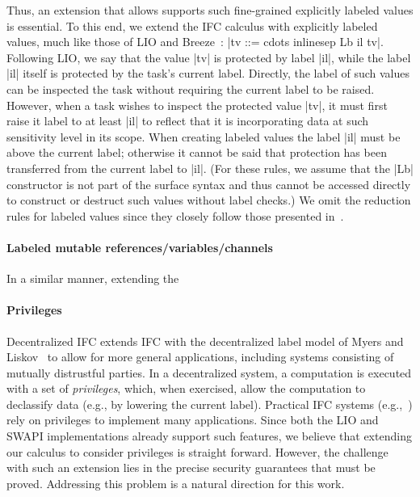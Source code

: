 Thus, an extension that allows supports such fine-grained explicitly
labeled values is essential.
%
To this end, we extend the IFC calculus with explicitly labeled
values, much like those of LIO and
Breeze~\cite{lio, Hritcu:2013:YIB:2497621.2498098}: |tv ::= cdots
inlinesep Lb il tv|.
%
Following LIO, we say that the value |tv| is protected by label |il|,
while the label |il| itself is protected by the task's current label.
%
%
Directly, the label of such values can be inspected the task without
requiring the current label to be raised.
%
However, when a task wishes to inspect the protected value |tv|, it
must first raise it label to at least |il| to reflect that it is
incorporating data at such sensitivity level in its scope.
%
When creating labeled values the label |il| must be above
the current label; otherwise it cannot be said that protection has
been transferred from the current label to |il|.
%
(For these rules, we assume that the |Lb| constructor is not part of
the surface syntax and thus cannot be accessed directly to construct
or destruct such values without label checks.)
% 
We omit the reduction rules for labeled values since they closely
follow those presented in~\cite{lio}.

\paragraph{Labeled mutable references/variables/channels}
%
In a similar manner, extending the 

\paragraph{Privileges}
Decentralized IFC extends IFC with the decentralized label model of
Myers and Liskov~\cite{myers:dlm} to allow for more general
applications, including systems consisting of mutually distrustful
parties.  In a decentralized system, a computation is executed with a
set of \emph{privileges}, which, when exercised, allow the computation
to declassify data (e.g., by lowering the current label).
%
Practical IFC systems
(e.g.,~\cite{Zeldovich:2006, lio,
Hritcu:2013:YIB:2497621.2498098, myers:jif}) rely on privileges to
implement many applications.
%
Since both the LIO and SWAPI implementations already support such features,
we believe that extending our calculus to consider privileges is
straight forward.
%
However, the challenge with such an extension lies in the precise
security guarantees that must be proved.
%
Addressing this problem is a natural direction for this work.

